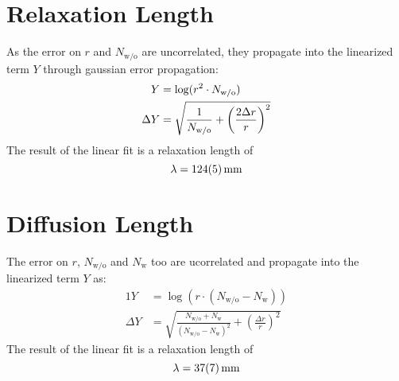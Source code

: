 \section{Relaxation Length}
As the error on $r$ and $N_\text{w/o}$ are uncorrelated, they propagate into the linearized term $Y$ through gaussian error propagation:
\begin{alignat}{1}
	Y &= \log(r^2 \cdot N_\text{w/o}) \nonumber\\
	\Delta Y &= \sqrt{
		\frac{1}{N_\text{w/o}} +
		\left(\frac{2 \Delta r}{r}\right)^2
	}
\end{alignat}
The result of the linear fit is a relaxation length of 
\begin{equation*}
	\lambda = \SI{124 +- 5}{\mm}
\end{equation*}

\section{Diffusion Length}
The error on $r$, $N_\text{w/o}$ and $N_\text{w}$ too are ucorrelated and propagate into the linearized term $Y$ as:
\begin{alignat}{1}
	Y &= \log(r \cdot (N_\text{w/o} - N_\text{w})) \nonumber\\
	\Delta Y &= \sqrt{
		\frac{N_\text{w/o} + N_\text{w}}{(N_\text{w/o} - N_\text{w})^2} +
		\left(\frac{\Delta r}{r}\right)^2
	}
\end{alignat}
The result of the linear fit is a relaxation length of 
\begin{equation*}
	\lambda = \SI{37 +- 7}{\mm}
\end{equation*}
